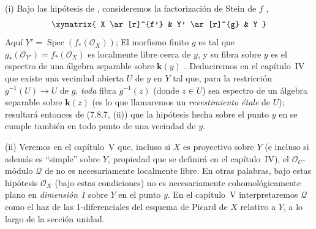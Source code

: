 \begin{remarks}[7.8.10]
\label{III.7.8.10}
\textnormal{(i)}
Bajo las hipótesis de , consideremos la
factorización de Stein de $f$ ,
\[
\xymatrix{
  X \ar[r]^{f'} & Y' \ar[r]^{g} & Y
}
\]
Aquí
$Y'=\operatorname{Spec}(f_*(\mathscr O_X))$;
El morfismo finito $g$ es tal que
$g_*(\mathscr O_{Y'})=f_*(\mathscr O_X)$
es localmente libre cerca de $y$, y su fibra sobre $y$ es el
espectro de una álgebra separable sobre $\boldsymbol{k}(y)$
. Deduciremos en el capítulo~IV que existe una
vecindad abierta $U$ de $y$ en $Y$ tal que, para la restricción
$g^{-1}(U)\to U$ de $g$, \emph{toda} fibra $g^{-1}(z)$ (donde $z\in U$) sea espectro de un álgebra separable sobre $\boldsymbol{k}(z)$ (es lo que llamaremos un \emph{revestimiento étale} de $U$); resultará entonces de (7.8.7, (ii)) que la hipótesis hecha sobre el punto $y$ en  se cumple también
en todo punto de una vecindad de $y$.

\medskip
\textnormal{(ii)}
Veremos en el capítulo~V que, incluso si $X$ es proyectivo sobre $Y$
(e incluso si además es ``simple'' sobre $Y$, propiedad que se
definirá en el capítulo~IV), el $\mathscr O_U$-módulo $\mathscr Q$
de  no es necesariamente localmente libre. En otras
palabras, bajo estas hipótesis $\mathscr O_X$ (bajo estas
condiciones) no es necesariamente cohomológicamente plano en \emph{dimensión
1} sobre $Y$ en el
punto $y$. En el capítulo~V interpretaremos $\mathscr Q$ como el
haz de las 1-diferenciales del esquema de Picard de $X$ relativo a
$Y$, a lo largo de la sección unidad.
\end{remarks}
